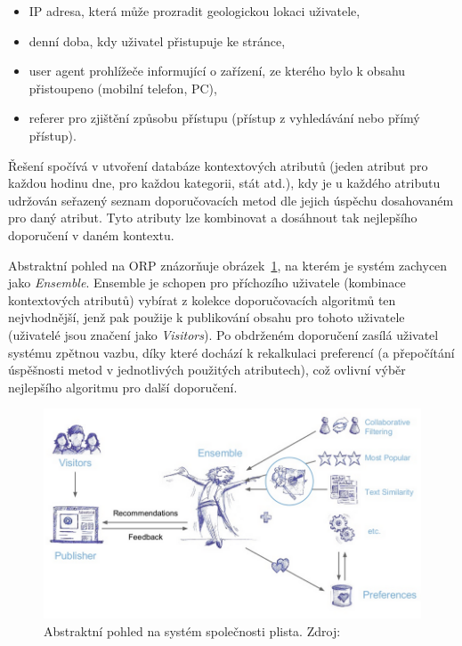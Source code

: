 \documentclass[thesis=M,czech]{FITthesis}[2014/05/07]
\begin{document}
\begin{itemize}
	\item IP adresa, která může prozradit geologickou lokaci uživatele,
	\item denní doba, kdy uživatel přistupuje ke stránce,
	\item user agent prohlížeče informující o zařízení, ze kterého bylo k obsahu přistoupeno (mobilní telefon, PC),
	\item referer pro zjištění způsobu přístupu (přístup z vyhledávání nebo přímý přístup). 
\end{itemize}

Řešení spočívá v utvoření databáze kontextových atributů (jeden atribut pro každou hodinu dne, pro každou kategorii, stát atd.), kdy je u každého atributu udržován seřazený seznam doporučovacích metod dle jejich úspěchu dosahovaném pro daný atribut. Tyto atributy lze kombinovat a dosáhnout tak nejlepšího doporučení v daném kontextu.

Abstraktní pohled na ORP znázorňuje obrázek~\ref{fig:plista}, na kterém je systém zachycen jako \emph{Ensemble}. Ensemble je schopen pro příchozího uživatele (kombinace kontextových atributů) vybírat z kolekce doporučovacích algoritmů ten nejvhodnější, jenž pak použije k publikování obsahu pro tohoto uživatele (uživatelé jsou značení jako \emph{Visitors}). Po obdrženém doporučení zasílá uživatel systému zpětnou vazbu, díky které dochází k rekalkulaci preferencí (a přepočítání úspěšnosti metod v jednotlivých použitých atributech), což ovlivní výběr nejlepšího algoritmu pro další doporučení.

\begin{figure}\centering
	\includegraphics[width=1.0\textwidth]{obr/plistaEnsemble.png}
 	\caption[Abstraktní pohled na systém společnosti plista]{Abstraktní pohled na systém společnosti plista. Zdroj: \cite{slideshare:plista}}\label{fig:plista}
\end{figure}	
\end{document}
